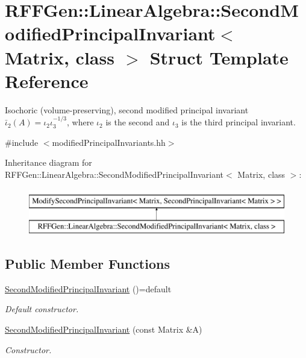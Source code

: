 \hypertarget{structRFFGen_1_1LinearAlgebra_1_1SecondModifiedPrincipalInvariant}{\section{R\-F\-F\-Gen\-:\-:Linear\-Algebra\-:\-:Second\-Modified\-Principal\-Invariant$<$ Matrix, class $>$ Struct Template Reference}
\label{structRFFGen_1_1LinearAlgebra_1_1SecondModifiedPrincipalInvariant}
}


Isochoric (volume-\/preserving), second modified principal invariant $ \bar\iota_2(A)=\iota_2\iota_3^{-1/3} $, where $\iota_2$ is the second and $\iota_3$ is the third principal invariant.  




{\ttfamily \#include $<$modified\-Principal\-Invariants.\-hh$>$}

Inheritance diagram for R\-F\-F\-Gen\-:\-:Linear\-Algebra\-:\-:Second\-Modified\-Principal\-Invariant$<$ Matrix, class $>$\-:\begin{figure}[H]
\begin{center}
\leavevmode
\includegraphics[height=2.000000cm]{structRFFGen_1_1LinearAlgebra_1_1SecondModifiedPrincipalInvariant}
\end{center}
\end{figure}
\subsection*{Public Member Functions}
\begin{DoxyCompactItemize}
\item 
\hypertarget{structRFFGen_1_1LinearAlgebra_1_1SecondModifiedPrincipalInvariant_ae7e278ae20ef756aeb2281a0cd6eed39}{\hyperlink{structRFFGen_1_1LinearAlgebra_1_1SecondModifiedPrincipalInvariant_ae7e278ae20ef756aeb2281a0cd6eed39}{Second\-Modified\-Principal\-Invariant} ()=default}\label{structRFFGen_1_1LinearAlgebra_1_1SecondModifiedPrincipalInvariant_ae7e278ae20ef756aeb2281a0cd6eed39}

\begin{DoxyCompactList}\small\item\em Default constructor. \end{DoxyCompactList}\item 
\hyperlink{structRFFGen_1_1LinearAlgebra_1_1SecondModifiedPrincipalInvariant_a4c7ced997d5086bce88bbba02ad7aeb9}{Second\-Modified\-Principal\-Invariant} (const Matrix \&A)
\begin{DoxyCompactList}\small\item\em Constructor. \end{DoxyCompactList}\end{DoxyCompactItemize}


